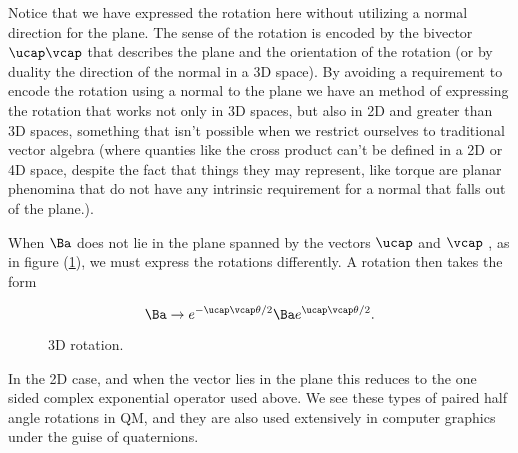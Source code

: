 Notice that we have expressed the rotation here without utilizing a normal direction for the plane.  The sense of the rotation is encoded by the bivector $\ucap \vcap$ that describes the plane and the orientation of the rotation (or by duality the direction of the normal in a 3D space).  By avoiding a requirement to encode the rotation using a normal to the plane we have an method of expressing the rotation that works not only in 3D spaces, but also in 2D and greater than 3D spaces, something that isn't possible when we restrict ourselves to traditional vector algebra (where quanties like the cross product can't be defined in a 2D or 4D space, despite the fact that things they may represent, like torque are planar phenomina that do not have any intrinsic requirement for a normal that falls out of the plane.).

When $\Ba$ does not lie in the plane spanned by the vectors $\ucap$ and $\vcap$ , as in figure (\ref{fig:gaQuickIntro:gaQuickIntroFig2}), we must express the rotations differently.  A rotation then takes the form

\begin{equation}\label{eqn:gaQuickIntro:210}
\Ba \rightarrow 
e^{-\ucap \vcap \theta/2}  
\Ba 
e^{\ucap \vcap \theta/2}.
\end{equation}

\begin{figure}[htp]
   \centering
   \def\svgwidth{0.6\columnwidth}
   
   \caption{3D rotation.}\label{fig:gaQuickIntro:gaQuickIntroFig2}
\end{figure}

In the 2D case, and when the vector lies in the plane this reduces to the one sided complex exponential operator used above.  We see these types of paired half angle rotations in QM, and they are also used extensively in computer graphics under the guise of quaternions.

\EndArticle
